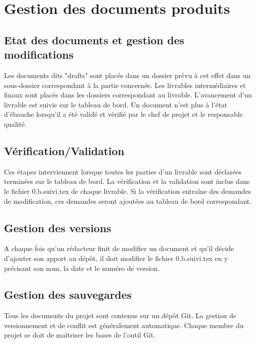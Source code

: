 \section{Gestion des documents produits}
\subsection{Etat des documents et gestion des modifications}
Les documents dits "drafts" sont placés dans un dossier prévu à cet effet dans un sous-dossier correspondant à la partie concernée. Les livrables intermédiaires et finaux sont placés dans les dossiers correspondant au livrable.
L'avancement d'un livrable est suivie sur le tableau de bord.
Un document n'est plus à l'état d'ébauche lorsqu'il a été validé et vérifié par le chef de projet et le responsable qualité.
\subsection{Vérification/Validation}
Ces étapes interviennent lorsque toutes les parties d'un livrable sont déclarées terminées sur le tableau de bord.
La vérification et la validation sont inclus dans le fichier 0.b.suivi.tex de chaque livrable. Si la vérification entraîne des demandes de modification, ces demandes seront ajoutées au tableau de bord correspondant.
\subsection{Gestion des versions}
A chaque fois qu'un rédacteur finit de modifier un document et qu'il décide d'ajouter son apport au dépôt, il doit modifier le fichier 0.b.suivi.tex en y précisant son nom, la date et le numéro de version.
\subsection{Gestion des sauvegardes}
Tous les documents du projet sont contenus sur un dépôt Git. La gestion de versionnement et de conflit est généralement automatique. Chaque membre du projet se doit de maîtriser les bases de l'outil Git.